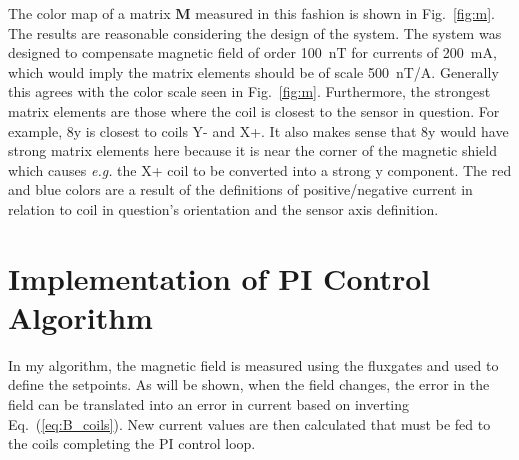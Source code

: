 
The color map of a matrix $\bm{M}$ measured in this fashion is shown in Fig.~\ref{fig:m}.  The results are reasonable considering the design of the system.  The system was designed to compensate magnetic field of order 100~nT for currents of 200~mA, which would imply the matrix elements should be of scale 500~nT/A.  Generally this agrees with the color scale seen in Fig.~\ref{fig:m}.  Furthermore, the strongest matrix elements are those where the coil is closest to the sensor in question.  For example, 8y is closest to coils Y- and X+.  It also makes sense that 8y would have strong matrix elements here because it is near the corner of the magnetic shield which causes {\it e.g.} the X+ coil to be converted into a strong y component.  The red and blue colors are a result of the definitions of positive/negative current in relation to coil in question's orientation and the sensor axis definition.



\section{Implementation of PI Control Algorithm}\label{sec:pi}
 In my algorithm, the magnetic field is measured using the fluxgates and used to define the setpoints. As will be shown, when the field changes, the error in the field can be translated into an error in current based on inverting Eq.~(\ref{eq:B_coils}). New current values are then calculated that must be fed to the coils completing the PI control loop. 


